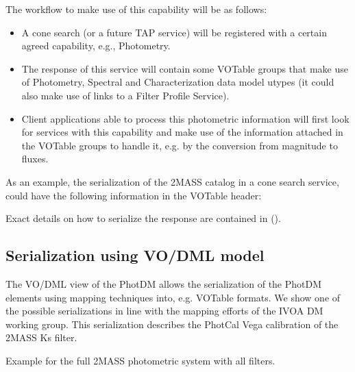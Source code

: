 \documentclass[11pt,a4paper]{ivoa}
\begin{document}
\begin{appendices}
The workflow to make use of this capability will be as follows:
\par

\begin{itemize}
	\item A cone search (or a future TAP service) will be registered with a certain agreed capability, e.g., Photometry.\par

	\item The response of this service will contain some VOTable groups that make use of Photometry, Spectral and Characterization data model utypes (it could also make use of links to a Filter Profile Service).\par

	\item Client applications able to process this photometric information will first look for services with this capability and make use of the information attached in the VOTable groups to handle it, e.g. by the conversion from magnitude to fluxes.
\end{itemize}\par

As an example, the serialization of the 2MASS catalog in a cone search service, could have the following information in the VOTable header:
\par


Exact details on how to serialize the response are contained in (\citep{derriere}).

\subsection{Serialization using VO/DML model} \label{appendixmapping}
The VO/DML view of the PhotDM allows the serialization of the PhotDM elements using mapping techniques into, e.g. VOTable formats. We show one of the possible serializations in line with the mapping efforts of the IVOA DM working group. This serialization describes the PhotCal Vega calibration of the 2MASS Ks filter.
\par 




 Example for the full 2MASS photometric system with all filters.
 


\end{appendices}


\end{document}
